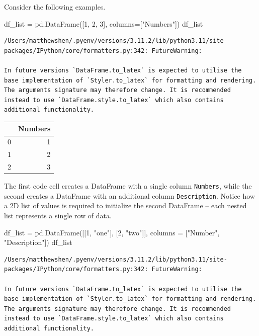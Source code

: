 \documentclass[
  letterpaper,
  DIV=11,
  numbers=noendperiod]{scrreprt}
\newenvironment{Shaded}{\begin{snugshade}}{\end{snugshade}}
\newcommand{\DecValTok}[1]{\textcolor[rgb]{0.68,0.00,0.00}{#1}}
\newcommand{\NormalTok}[1]{\textcolor[rgb]{0.00,0.23,0.31}{#1}}
\newcommand{\OperatorTok}[1]{\textcolor[rgb]{0.37,0.37,0.37}{#1}}
\newcommand{\StringTok}[1]{\textcolor[rgb]{0.13,0.47,0.30}{#1}}
\begin{document}
Consider the following examples.

\begin{Shaded}
\begin{Highlighting}[]
\NormalTok{df\_list }\OperatorTok{=}\NormalTok{ pd.DataFrame([}\DecValTok{1}\NormalTok{, }\DecValTok{2}\NormalTok{, }\DecValTok{3}\NormalTok{], columns}\OperatorTok{=}\NormalTok{[}\StringTok{"Numbers"}\NormalTok{])}
\NormalTok{df\_list}
\end{Highlighting}
\end{Shaded}

\begin{verbatim}
/Users/matthewshen/.pyenv/versions/3.11.2/lib/python3.11/site-packages/IPython/core/formatters.py:342: FutureWarning:

In future versions `DataFrame.to_latex` is expected to utilise the base implementation of `Styler.to_latex` for formatting and rendering. The arguments signature may therefore change. It is recommended instead to use `DataFrame.style.to_latex` which also contains additional functionality.
\end{verbatim}

\begin{tabular}{lr}
\toprule
{} &  Numbers \\
\midrule
0 &        1 \\
1 &        2 \\
2 &        3 \\
\bottomrule
\end{tabular}

The first code cell creates a DataFrame with a single column
\texttt{Numbers}, while the second creates a DataFrame with an
additional column \texttt{Description}. Notice how a 2D list of values
is required to initialize the second DataFrame -- each nested list
represents a single row of data.

\begin{Shaded}
\begin{Highlighting}[]
\NormalTok{df\_list }\OperatorTok{=}\NormalTok{ pd.DataFrame([[}\DecValTok{1}\NormalTok{, }\StringTok{"one"}\NormalTok{], [}\DecValTok{2}\NormalTok{, }\StringTok{"two"}\NormalTok{]], columns }\OperatorTok{=}\NormalTok{ [}\StringTok{"Number"}\NormalTok{, }\StringTok{"Description"}\NormalTok{])}
\NormalTok{df\_list}
\end{Highlighting}
\end{Shaded}

\begin{verbatim}
/Users/matthewshen/.pyenv/versions/3.11.2/lib/python3.11/site-packages/IPython/core/formatters.py:342: FutureWarning:

In future versions `DataFrame.to_latex` is expected to utilise the base implementation of `Styler.to_latex` for formatting and rendering. The arguments signature may therefore change. It is recommended instead to use `DataFrame.style.to_latex` which also contains additional functionality.
\end{verbatim}
\end{document}
